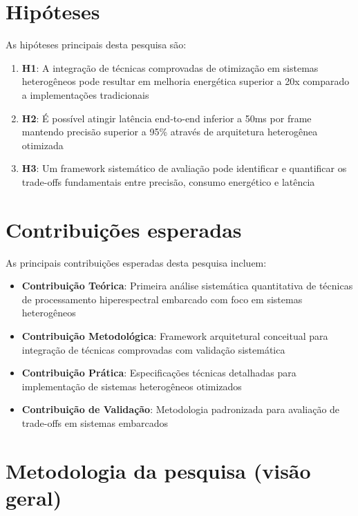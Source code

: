 \section{Hipóteses}\label{sec:hipoteses}

As hipóteses principais desta pesquisa são:

\begin{enumerate}
    \item \textbf{H1}: A integração de técnicas comprovadas de otimização em sistemas heterogêneos pode resultar em melhoria energética superior a 20x comparado a implementações tradicionais
    \item \textbf{H2}: É possível atingir latência end-to-end inferior a 50ms por frame mantendo precisão superior a 95\% através de arquitetura heterogênea otimizada
    \item \textbf{H3}: Um framework sistemático de avaliação pode identificar e quantificar os trade-offs fundamentais entre precisão, consumo energético e latência
\end{enumerate}

\section{Contribuições esperadas}\label{sec:contribuicoes}

As principais contribuições esperadas desta pesquisa incluem:

\begin{itemize}
    \item \textbf{Contribuição Teórica}: Primeira análise sistemática quantitativa de técnicas de processamento hiperespectral embarcado com foco em sistemas heterogêneos
    \item \textbf{Contribuição Metodológica}: Framework arquitetural conceitual para integração de técnicas comprovadas com validação sistemática
    \item \textbf{Contribuição Prática}: Especificações técnicas detalhadas para implementação de sistemas heterogêneos otimizados
    \item \textbf{Contribuição de Validação}: Metodologia padronizada para avaliação de trade-offs em sistemas embarcados
\end{itemize}

\section{Metodologia da pesquisa (visão geral)}\label{sec:metodologia_geral}

